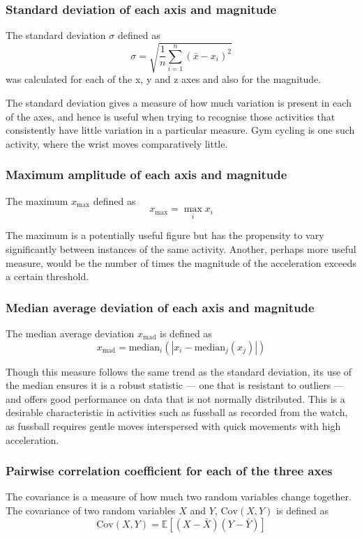       \subsubsection{Standard deviation of each axis and magnitude}
        The standard deviation $\sigma$ defined as $$\sigma = \sqrt{\frac{1}{n}\sum\limits_{i = 1}^{n}(\bar{x}-x_i)^2}$$ was calculated for each of the x, y and z axes and also for the magnitude.
        
        The standard deviation gives a measure of how much variation is present in each of the axes, and hence is useful when trying to recognise those activities that consistently have little variation in a particular measure. Gym cycling is one such activity, where the wrist moves comparatively little.
      \subsubsection{Maximum amplitude of each axis and magnitude}
        The maximum $x_{\max}$ defined as $$x_{\max} = \max_i x_i $$
        
        The maximum is a potentially useful figure but has the propensity to vary significantly between instances of the same activity. Another, perhaps more useful measure, would be the number of times the magnitude of the acceleration exceeds a certain threshold. 
      \subsubsection{Median average deviation of each axis and magnitude}
        The median average deviation $x_\mathrm{mad}$ is defined as $$x_\mathrm{mad} = \mathrm{median}_i (|x_i - \mathrm{median}_j(x_j)|)$$
        
        Though this measure follows the same trend as the standard deviation, its use of the median ensures it is a robust statistic --- one that is resistant to outliers --- and offers good performance on data that is not normally distributed. This is a desirable characteristic in activities such as fussball as recorded from the watch, as fussball requires gentle moves interspersed with quick movements with high acceleration.
      \subsubsection{Pairwise correlation coefficient for each of the three axes}
        The covariance is a measure of how much two random variables change together. The covariance of two random variables $X$ and $Y$, $\mathrm{Cov}(X, Y)$ is defined as $$\mathrm{Cov}(X, Y) = \mathbb{E}[(X - \bar{X})(Y - \bar{Y})]$$
        

